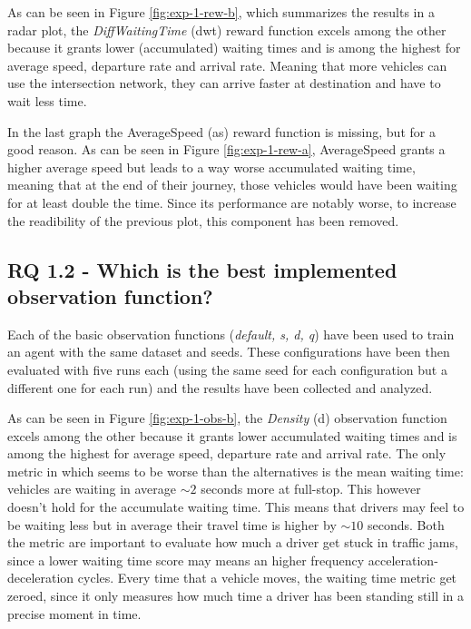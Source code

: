 As can be seen in Figure \ref{fig:exp-1-rew-b}, which summarizes the results in a radar plot, the \textit{DiffWaitingTime} (dwt) reward function excels among the other because it grants lower (accumulated) waiting times and is among the highest for average speed, departure rate and arrival rate.
Meaning that more vehicles can use the intersection network, they can arrive faster at destination and have to wait less time.

In the last graph the AverageSpeed (as) reward function is missing, but for a good reason.
As can be seen in Figure \ref{fig:exp-1-rew-a}, AverageSpeed grants a higher average speed but leads to a way worse accumulated waiting time, meaning that at the end of their journey, those vehicles would have been waiting for at least double the time.
Since its performance are notably worse, to increase the readibility of the previous plot, this component has been removed.



\subsection{RQ 1.2 - Which is the best implemented observation function?}

Each of the basic observation functions (\textit{default, s, d, q}) have been used to train an agent with the same dataset and seeds. These configurations have been then evaluated with five runs each (using the same seed for each configuration but a different one for each run) and the results have been collected and analyzed.

As can be seen in Figure \ref{fig:exp-1-obs-b}, the \textit{Density} (d) observation function excels among the other because it grants lower accumulated waiting times and is among the highest for average speed, departure rate and arrival rate.
The only metric in which seems to be worse than the alternatives is the mean waiting time: vehicles are waiting in average $\sim2$ seconds more at full-stop.
This however doesn't hold for the accumulate waiting time.
This means that drivers may feel to be waiting less but in average their travel time is higher by $\sim10$ seconds.
Both the metric are important to evaluate how much a driver get stuck in traffic jams, since a lower waiting time score may means an higher frequency acceleration-deceleration cycles.
Every time that a vehicle moves, the waiting time metric get zeroed, since it only measures how much time a driver has been standing still in a precise moment in time.

